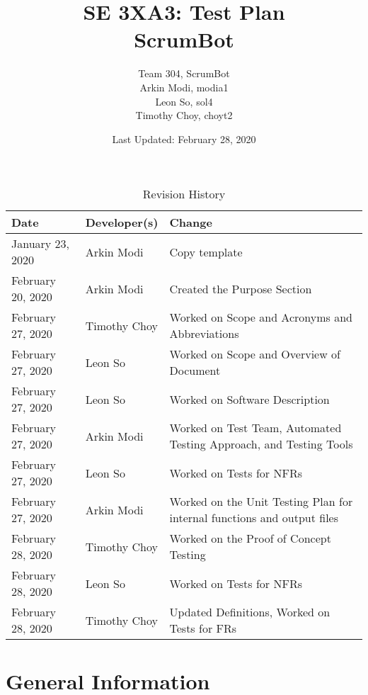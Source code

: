 \documentclass[12pt, titlepage]{article}
\title{SE 3XA3: Test Plan\\ScrumBot}
\author{
	Team 304, ScrumBot
		\\ Arkin Modi, modia1
        \\ Leon So, sol4
        \\ Timothy Choy, choyt2
}
\date{Last Updated: February 28, 2020}
\begin{document}
\newpage
\maketitle

\tableofcontents
\listoftables
\listoffigures

\newpage

\begin{table}[!hbp]
    \caption{Revision History} \label{TblRevisionHistory}
    \begin{tabularx}{\textwidth}{llX}
        \toprule
            \textbf{Date} & \textbf{Developer(s)} & \textbf{Change}\\
        \midrule
            January 23, 2020 & Arkin Modi & Copy template\\
            February 20, 2020 & Arkin Modi & Created the Purpose Section\\
            February 27, 2020 & Timothy Choy & Worked on Scope and Acronyms and Abbreviations\\
            February 27, 2020 & Leon So & Worked on Scope and Overview of Document\\
            February 27, 2020 & Leon So & Worked on Software Description\\
            February 27, 2020 & Arkin Modi & Worked on Test Team, Automated Testing Approach, and Testing Tools\\
            February 27, 2020 & Leon So & Worked on Tests for NFRs\\
            February 27, 2020 & Arkin Modi & Worked on the Unit Testing Plan for internal functions and output files\\
            February 28, 2020 & Timothy Choy & Worked on the Proof of Concept Testing\\
            February 28, 2020 & Leon So & Worked on Tests for NFRs\\
            February 28, 2020 & Timothy Choy & Updated Definitions, Worked on Tests for FRs\\
        \bottomrule
    \end{tabularx}
\end{table}


\newpage


\section{General Information}
\end{document}
